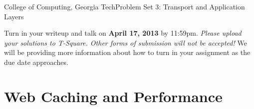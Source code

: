 \documentclass[11pt]{article}
\begin{document}


{College of Computing, Georgia Tech}{Problem Set 3: Transport and
  Application Layers} 


Turn in your writeup and talk on {\bf April 17, 2013} by 11:59pm.
{\em Please upload your solutions to T-Square.  Other forms of
  submission will not be accepted!}  We will be providing more
information about how to turn in your assignment as the due date
approaches.

\section{Web Caching and Performance}
\end{document}
